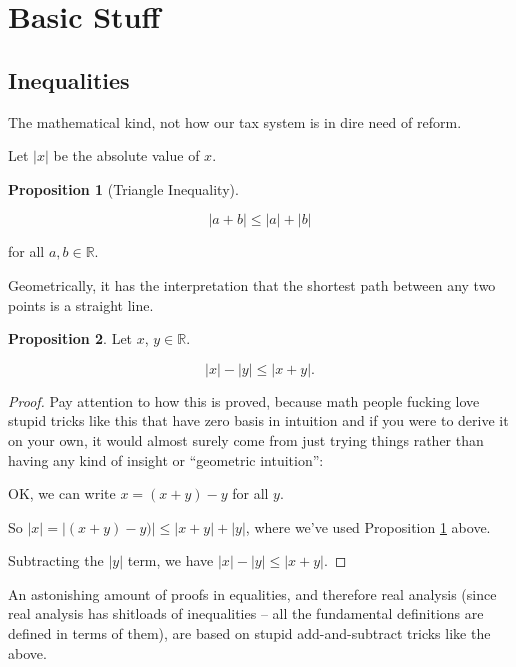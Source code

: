 \documentclass{article}
\theoremstyle{definition}
\newtheorem{proposition}{Proposition}[section]
\begin{document}
\section{Basic Stuff}

\subsection{Inequalities}
The mathematical kind, not how our tax system is in dire need of reform.

Let $|x|$ be the absolute value of $x$.

\begin{proposition}[Triangle Inequality] \label{triangle-inequality}

\begin{equation*} 
|a + b| \leq |a| + |b| 
\end{equation*}

for all $a, b \in \mathbb{R}$.

\end{proposition}

Geometrically, it has the interpretation that the shortest path between any two points is a straight line.

\begin{proposition}
Let $x$, $y \in \mathbb{R}$.

\begin{equation*}
|x| - |y| \leq |x + y|.
\end{equation*}
\end{proposition}

\begin{proof}
Pay attention to how this is proved, because math people fucking love stupid tricks like this that have zero basis in intuition and if you were to derive it on your own, it would almost surely come from just trying things rather than having any kind of insight or ``geometric intuition'':

OK, we can write $x = (x + y) - y$ for all $y$.

So $|x| = | (x+y) - y) | \leq |x + y| + |y|$, where we've used Proposition \ref{triangle-inequality} above.

Subtracting the $|y|$ term, we have $|x| - |y| \leq |x + y|$.
\end{proof}

An astonishing amount of proofs in equalities, and therefore real analysis (since real analysis has shitloads of inequalities -- all the fundamental definitions are defined in terms of them), are based on stupid add-and-subtract tricks like the above.
\end{document}
